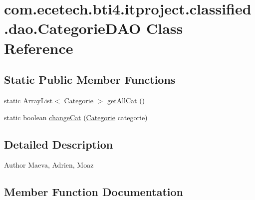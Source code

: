 \hypertarget{classcom_1_1ecetech_1_1bti4_1_1itproject_1_1classified_1_1dao_1_1_categorie_d_a_o}{}\section{com.\+ecetech.\+bti4.\+itproject.\+classified.\+dao.\+Categorie\+D\+AO Class Reference}
\label{classcom_1_1ecetech_1_1bti4_1_1itproject_1_1classified_1_1dao_1_1_categorie_d_a_o}
\subsection*{Static Public Member Functions}
\begin{DoxyCompactItemize}
\item 
static Array\+List$<$ \hyperlink{classcom_1_1ecetech_1_1bti4_1_1itproject_1_1classified_1_1beans_1_1_categorie}{Categorie} $>$ \hyperlink{classcom_1_1ecetech_1_1bti4_1_1itproject_1_1classified_1_1dao_1_1_categorie_d_a_o_a3e7fe47e89b6a9fc25fd8037d3f5acf7}{get\+All\+Cat} ()
\item 
static boolean \hyperlink{classcom_1_1ecetech_1_1bti4_1_1itproject_1_1classified_1_1dao_1_1_categorie_d_a_o_a003d6a6dce5a0c96895c78547931a5ca}{change\+Cat} (\hyperlink{classcom_1_1ecetech_1_1bti4_1_1itproject_1_1classified_1_1beans_1_1_categorie}{Categorie} categorie)
\end{DoxyCompactItemize}


\subsection{Detailed Description}
\begin{DoxyAuthor}{Author}
Maeva, Adrien, Moaz 
\end{DoxyAuthor}


\subsection{Member Function Documentation}
